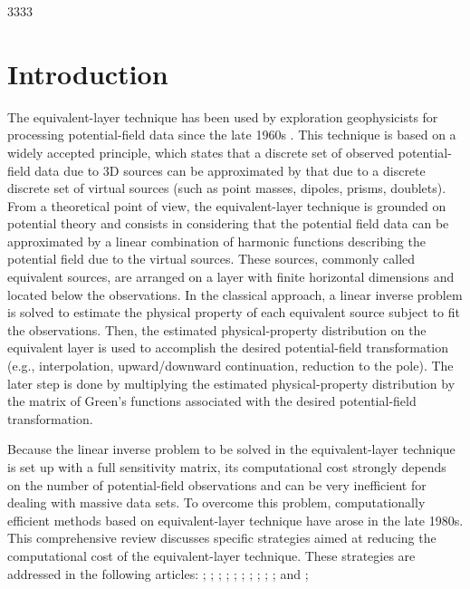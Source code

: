 3333\section{Introduction}

The equivalent-layer technique has been used by exploration geophysicists for processing potential-field 
data since the late 1960s \citep{dampney1969}. 
This technique is based on a widely accepted principle, which states that a discrete set of observed 
potential-field data due to 3D sources 
can be approximated by that due to a discrete discrete set of virtual sources (such as point 
masses, dipoles, prisms, doublets). From a theoretical point of view, the equivalent-layer 
technique is grounded on potential theory \citep{kellogg1967} and consists in considering 
that the potential field data can be approximated by a linear combination of harmonic 
functions describing the potential field due to the virtual sources. These sources, commonly 
called equivalent sources, are arranged on a layer with finite horizontal dimensions and 
located below the observations. In the classical approach, a linear inverse problem is 
solved to estimate the physical property of each equivalent source subject to fit the 
observations. Then, the estimated physical-property distribution on the equivalent layer is 
used to accomplish the desired potential-field transformation (e.g., interpolation, 
upward/downward continuation, reduction to the pole). The later step is done by multiplying 
the estimated physical-property distribution by the matrix of Green's functions associated 
with the desired potential-field transformation.

Because the linear inverse problem to be solved in the equivalent-layer technique is set up 
with a full sensitivity matrix, its computational cost strongly depends on the number of 
potential-field observations and can be very inefficient for dealing with massive data sets. 
To overcome this problem, computationally efficient methods based on equivalent-layer 
technique have arose in the late 1980s. 
This comprehensive review discusses specific strategies aimed at reducing the computational cost of the equivalent-layer technique.
These strategies are addressed in the following articles: 
\cite{leao-silva1989};
\cite{cordell1992};
\cite{xia-etal1993};
\cite{mendonca-silva1994};  
\cite{guspi-novara2009};
\cite{li-oldenburg2010};
\cite{oliveirajr-etal2013};
\cite{siqueira-etal2017};
\cite{jirigalatu-ebbing2019};
\citet{takahashi-etal2020,takahashi-etal2022}
\cite{mendonca2020}; and
\cite{soler-uieda2021};



